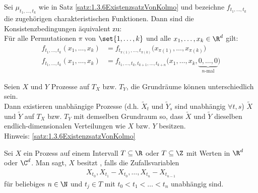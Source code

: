 \begin{aufgabenr}\label{aufg:6}
	Sei $\mu_{t_1,\ldots,t_k}$ wie in Satz \ref{satz:1.3.6ExistenzsatzVonKolmo} und bezeichne $f_{t_1,\ldots,t_k}$ die zugehörigen charakteristischen Funktionen.
	Dann sind die Konsistenzbedingungen äquivalent zu:\\
		Für alle Permutationen $\pi$ von $\set{1,\ldots,k}$ und alle $x_1,\ldots,x_k\in\R^d$ gilt:
		\begin{align*}
			f_{t_1,\ldots,t_k}(x_1,\ldots,x_k)&=f_{t_{\pi(1)},\ldots,t_{\pi(k)}}\big(x_{\pi(1)},\ldots,x_{\pi(k)}\big)\\
			f_{t_1,\ldots,t_k}(x_1,\ldots,x_k)
			&=f_{t_1,\ldots,t_k,t_{k+1},\ldots,t_{k+n}}\big(x_1,\ldots,x_k,\underbrace{0,\ldots,0}_{n\text{-mal}}\big)
		\end{align*}
\end{aufgabenr}

\begin{aufgabenr}\label{aufg:7}
	Seien $X$ und $Y$ Prozesse auf $T_X$ bzw. $T_Y$, die Grundräume können unterschiedlich sein.\\
	Dann existieren unabhängige Prozesse (d.h. $\tilde{X}_t$ und $\tilde{Y}_s$ sind unabhängig $\forall t,s$) $\tilde{X}$ und $\tilde{Y}$ auf $T_X$ bzw. $T_Y$ mit demselben Grundraum so, dass $\tilde{X}$ und $\tilde{Y}$ dieselben endlich-dimensionalen Verteilungen wie $X$ bzw. $Y$ besitzen.\\
	Hinweis: \ref{satz:1.3.6ExistenzsatzVonKolmo}
\end{aufgabenr}

\setcounter{satz}{9} %

\begin{definition}
	Sei $X$ ein Prozess auf einem Intervall $T\subseteq\R$ oder $T\subseteq\Z$ mit Werten in $\R^d$ oder $\C^d$.
	Man sagt, $X$ besitzt , falls die Zufallsvariablen 
	\begin{align*}
		X_{t_0},X_{t_1}-X_{t_0},\ldots,X_{t_n}-X_{t_{n-1}}	
	\end{align*}
	für beliebiges $n\in\N$ und $t_j\in T$ mit $t_0<t_1<\ldots<t_n$ unabhängig sind.
\end{definition}

